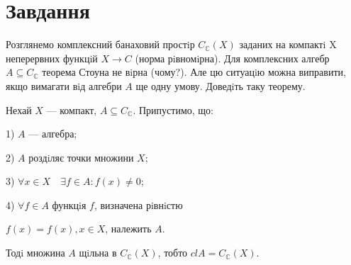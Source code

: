 
\chapter{Завдання \theHchapter}

\begin{tcolorbox}[title=Завдання]
    Розглянемо комплексний банаховий простiр 
    $C_{\mathbb{C}}(X)$ заданих на компактi X неперервних
    функцiй $X \rightarrow C$ (норма рiвномiрна). 
    Для комплексних алгебр $A \subseteq C_{\mathbb{C}}$ 
    теорема Стоуна не вiрна (чому?). 
    Але цю ситуацiю можна виправити, якщо вимагати вiд алгебри $A$ 
    ще одну умову. Доведiть таку теорему.
\end{tcolorbox}


\begin{tcolorbox}[title=Теорема Cтоуна для комплексних алгебр]
    Нехай $X$ — компакт, $A \subseteq C_{\mathbb{C}}$. 
    Припустимо, що:


    1) $A$ — алгебра;


    2) $A$ роздiляє точки множини $X$;


    3) $\forall x \in X \quad \exists f \in A: f(x) \neq 0$;


    4) $\forall f \in A$ функцiя $f$, визначена рiвнiстю
    
    
    \quad $f(x) = f(x), x \in X$, належить $A$.


    Тодi множина $A$ щiльна в $C_{\mathbb{C}}(X)$, 
    тобто $clA = C_{\mathbb{C}}(X)$.
\end{tcolorbox}

